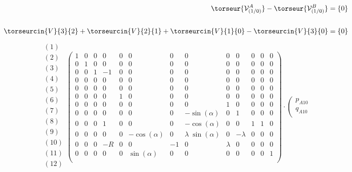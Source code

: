 \begin{align*}
\torseur{\mathcal{V}^{A}_{(1/0)}}-\torseur{\mathcal{V}^{B}_{(1/0)}}=\left\{0\right\}\\
\\
\torseurcin{V}{3}{2}+	\torseurcin{V}{2}{1}	
+	\torseurcin{V}{1}{0}-\torseurcin{V}{3}{0}	=\left\{0\right\}
\end{align*}
\begin{align*}
\begin{array}{c}
(1)\\
(2)\\
(3)\\
(4)\\
(5)\\
(6)\\
(7)\\
(8)\\
(9)\\
(10)\\
(11)\\
(12)\\
\end{array}
\left(
\begin{array}{ccccccccccccc}
1 & 0 & 0 & 0 & 0 & 0 & 0 & 0 & 0 & 0 & 0 & 0 & 0 \\
0 & 1 & 0 & 0 & 0 & 0 & 0 & 0 & 0 & 0 & 0 & 0 & 0 \\ 
0 & 0 & 1 & -1 & 0 & 0 & 0 & 0 & 0 & 0 & 0 & 0 & 0 \\ 
0 & 0 & 0 & 0 & 0 & 0 & 0 & 0 & 0 & 0 & 0 & 0 & 0 \\ 
0 & 0 & 0 & 0 & 0 & 0 & 0 & 0 & 0 & 0 & 0 & 0 & 0 \\ 
0 & 0 & 0 & 0 & 1 & 0 & 0 & 0 & 0 & 0 & 0 & 0 & 0 \\  
0 & 0 & 0 & 0 & 0 & 0 & 0 & 0 & 1 & 0 & 0 & 0 & 0 \\ 
0 & 0 & 0 & 0 & 0 & 0 & 0 & -\sin(\alpha) & 0 & 1 & 0 & 0 & 0 \\
0 & 0 & 0 & 1 & 0 & 0 & 0 & -\cos(\alpha) & 0 & 0 & 1 & 1 & 0 \\
0 & 0 & 0 & 0 & 0 & -\cos(\alpha) & 0 & \lambda \;\sin(\alpha) & 0 & -\lambda & 0 & 0 & 0 \\ 
0 & 0 & 0 & -R & 0 & 0 & -1 & 0 & \lambda & 0 & 0 & 0 & 0 \\
0 & 0 & 0 & 0 & 0 & \sin(\alpha) & 0 & 0 & 0 & 0 & 0 & 0 & 1 \\ 
\end{array} 
\right)
\cdot 
\left(
\begin{array}{c}
p_{A10}\\
q_{A10}\\

\end{array}
\end{align*}
